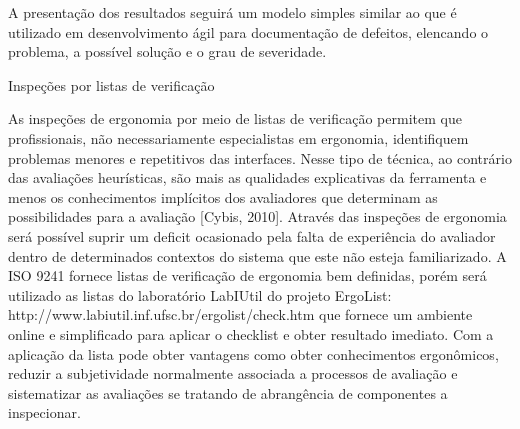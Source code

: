 A presentação dos resultados seguirá um modelo simples similar ao que é utilizado em desenvolvimento ágil para documentação de defeitos, elencando o problema, a possível solução e o grau de severidade.

Inspeções por listas de verificação

As inspeções de ergonomia por meio de listas de verificação permitem que profissionais, não necessariamente especialistas em ergonomia, identifiquem problemas menores e repetitivos das interfaces. Nesse tipo de técnica, ao contrário das avaliações heurísticas, são mais as qualidades explicativas da ferramenta e menos os conhecimentos implícitos dos avaliadores que determinam as possibilidades para a avaliação [Cybis, 2010].
Através das inspeções de ergonomia será possível suprir um deficit ocasionado pela falta de experiência do avaliador dentro de determinados contextos do sistema que este não esteja familiarizado.
A ISO 9241 fornece listas de verificação de ergonomia bem definidas, porém será utilizado as listas do laboratório LabIUtil do projeto ErgoList: http://www.labiutil.inf.ufsc.br/ergolist/check.htm que fornece um ambiente online e simplificado para aplicar o checklist e obter resultado imediato.
Com a aplicação da lista pode obter vantagens como obter conhecimentos ergonômicos, reduzir a subjetividade normalmente associada a processos de avaliação e sistematizar as avaliações se tratando de abrangência de componentes a inspecionar.